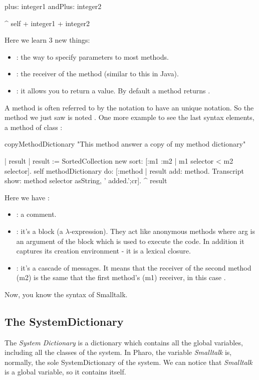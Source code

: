 \begin{code}{}
plus: integer1 andPlus: integer2 

\tab^ self + integer1 + integer2
\end{code}
Here we learn 3 new things:
\begin{itemize}
	\item \ct{:} : the way to specify parameters to most methods.
	\item {} : the receiver of the method (similar to this in Java).
	\item \ct{\^} : it allows you to return a value\footnotemark. By default a method returns .
\end{itemize}
A method is often referred to by the notation  to have an unique notation. So the method we just saw is noted . 
One more example to see the last syntax elements, a method of class :
\begin{code}{}
copyMethodDictionary
	   "This method answer a copy of my method dictionary"
	
	   | result |
	   result := SortedCollection new sort: [:m1 :m2 | m1 selector < m2 selector].
	   self methodDictionary do: [:method |
	       result add: method.
	       Transcript  show: method selector asString, ' added.';cr].
       ^ result
\end{code}
Here we have :
\begin{itemize}
	\item {} : a comment.
	\item {} : it's a block (a $\lambda$-expression). They act like anonymous methods where arg is an argument of the block which is used to execute the code. In addition it captures its creation environment - it is a lexical closure.
	\item {} : it's a cascade of messages. It means that the receiver of the second method (m2) is the same that the first method's (m1) receiver, in this case .
\end{itemize}

Now, you know the syntax of \gls{Smalltalk}.

\subsection{The SystemDictionary}

The \emph{System Dictionary} is a dictionary which contains all the global variables, including all the classes of the system. In \gls{Pharo}, the variable \emph{Smalltalk} is, normally, the sole SystemDictionary of the system. We can notice that \emph{Smalltalk} is a global variable, so it contains itself.

